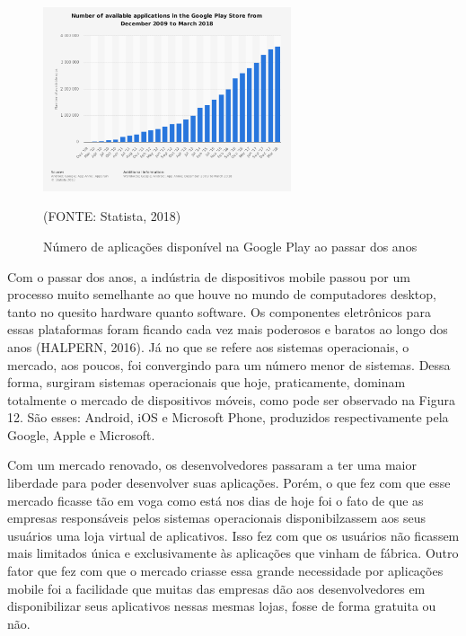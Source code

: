 \documentclass[
    12pt,       %
    openright,      %
    twoside,      %
    a4paper,      %
    english,      %
    french,       %
    spanish,      %
    brazil,       %
    ]{abntex2}
\begin{document}
      \begin{figure}[htbp]
            \begin{center}
                \includegraphics[width=0.65\textwidth]{img/numberApps.png}
            \end{center}
        \caption{\label{fig:passaro}Número de aplicações disponível na Google Play ao passar dos anos}
        \begin{center}(FONTE: Statista, 2018)\end{center}
      \end{figure}

      Com o passar dos anos, a indústria de dispositivos mobile passou por um processo muito
      semelhante ao que houve no mundo de computadores desktop, tanto no quesito hardware quanto
      software. Os componentes eletrônicos para essas plataformas foram ficando cada vez mais
      poderosos e baratos ao longo dos anos (HALPERN, 2016). Já no que se refere aos sistemas
      operacionais, o mercado, aos poucos, foi convergindo para um número menor de sistemas. Dessa
      forma, surgiram sistemas operacionais que hoje, praticamente, dominam totalmente o mercado de
      dispositivos móveis, como pode ser observado na Figura 12. São esses: Android, iOS e
      Microsoft Phone, produzidos respectivamente pela Google, Apple e Microsoft.

      Com um mercado renovado, os desenvolvedores passaram a ter uma maior liberdade para poder
      desenvolver suas aplicações. Porém, o que fez com que esse mercado ficasse tão em voga
      como está nos dias de hoje foi o fato de que as empresas responsáveis pelos sistemas
      operacionais disponibilzassem aos seus usuários uma loja virtual de aplicativos.
      Isso fez com que os usuários não ficassem mais limitados única e exclusivamente
      às aplicações que vinham de fábrica. Outro fator que fez com que o mercado criasse
      essa grande necessidade por aplicações mobile foi a facilidade que muitas das
      empresas dão aos desenvolvedores em disponibilizar seus aplicativos nessas mesmas
      lojas, fosse de forma gratuita ou não.
\end{document}
